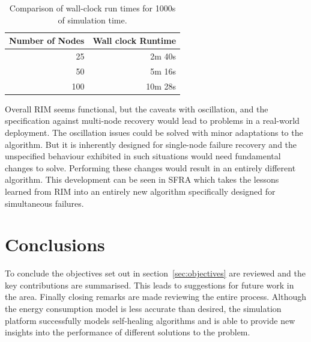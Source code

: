 \documentclass[authoryearcitations]{UoYCSproject}
\begin{document}
\begin{table}[]
\centering
\begin{tabular}{@{}rr@{}}
\toprule
Number of Nodes & Wall clock Runtime \\ \midrule
25              & 2m 40s             \\
50              & 5m 16s             \\
100             & 10m 28s            \\ \bottomrule
\end{tabular}
\caption{Comparison of wall-clock run times for 1000s of simulation time.}
\label{tab:runtimes}
\end{table}


Overall RIM seems functional, but the caveats with oscillation, and the specification against multi-node recovery would lead to problems in a real-world deployment. The oscillation issues could be solved with minor adaptations to the algorithm. But it is inherently designed for single-node failure recovery and the unspecified behaviour exhibited in such situations would need fundamental changes to solve. Performing these changes would result in an entirely different algorithm. This development can be seen in SFRA \citep{Alfadhly2012} which takes the lessons learned from RIM into an entirely new algorithm specifically designed for simultaneous failures.

\chapter{Conclusions}
\label{cha:Conclusion}

%

To conclude the objectives set out in section~\ref{sec:objectives} are reviewed and the key contributions are summarised. This leads to suggestions for future work in the area. Finally closing remarks are made reviewing the entire process. Although the energy consumption model is less accurate than desired, the simulation platform successfully models self-healing algorithms and is able to provide new insights into the performance of different solutions to the problem.
\end{document}
